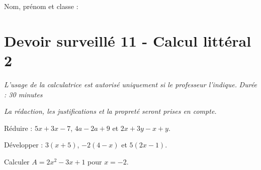 \documentclass[a4paper,10pt]{report}
\begin{document}
\pagestyle{empty}
\noindent Nom, prénom et classe : \dotfill

\section*{Devoir surveillé 11 - Calcul littéral 2}

\noindent \textit{L'usage de la calculatrice est autorisé uniquement si le professeur l'indique.} \hfill \textit{Durée : 30 minutes}

\medskip
\noindent \textit{La rédaction, les justifications et la propreté seront prises en compte.}


\begin{ex}[Réduire]
Réduire : $5x+3x-7$, $4a-2a+9$ et $2x+3y-x+y$.
\medskip\noindent\grandscarreaux{\linewidth}{3cm}
\end{ex}
\begin{ex}[Développer]
Développer : $3(x+5)$, $-2(4-x)$ et $5(2x-1)$.
\medskip\noindent\grandscarreaux{\linewidth}{4cm}
\end{ex}
\begin{ex}[Substituer]
Calculer $A=2x^2-3x+1$ pour $x=-2$.
\medskip\noindent\grandscarreaux{\linewidth}{3cm}
\end{ex}
\end{document}

